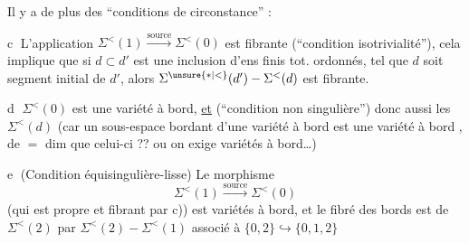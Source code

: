 Il y a de plus des ``conditions de circonstance'' :

\textcircled{c} L'application $\Sigma^{<}(1)\xrightarrow{\mathrm{source}}\Sigma^{<}(0)$ est  fibrante (``condition isotrivialité''), cela implique que  si $d\subset d'$ est une inclusion d'ens finis tot. ordonnés, tel que $d$ soit segment initial de $d'$, alors $\Sigma^{\unsure{*|<}}(d')-\Sigma^{<}(d)$ est fibrante.

\textcircled{d}  $\Sigma^{<}(0)$ est  une variété à bord, \uline{et}  (``condition non singulière'') donc aussi les $\Sigma^{<}(d)$ (car un sous-espace bordant d'une variété à bord est une variété à bord  , de $=$ dim que celui-ci ?? \unsure{\}} ou on exige   variétés à bord\ldots)

\textcircled{e} (Condition   équisingulière-lisse)
 Le morphisme
\[
\Sigma^{<}(1)\xrightarrow{\mathrm{source}}\Sigma^{<}(0)
\]
(qui est propre et fibrant par c))  est  variétés à bord, et le fibré des bords est   de $\Sigma^{<}(2)$ par $\Sigma^{<}(2)-\Sigma^{<}(1)$ associé à $\{0,2\}\hookrightarrow\{0,1,2\}$
